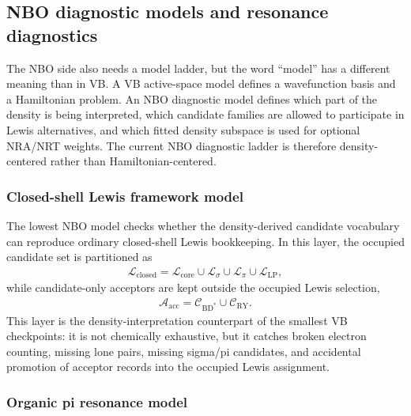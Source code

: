 \documentclass[11pt]{article}
\begin{document}
\subsection{NBO diagnostic models and resonance diagnostics}

The NBO side also needs a model ladder, but the word ``model'' has a different meaning than in VB.  A VB active-space model defines a wavefunction basis and a Hamiltonian problem.  An NBO diagnostic model defines which part of the density is being interpreted, which candidate families are allowed to participate in Lewis alternatives, and which fitted density subspace is used for optional NRA/NRT weights.  The current NBO diagnostic ladder is therefore density-centered rather than Hamiltonian-centered.

\subsubsection*{Closed-shell Lewis framework model}

The lowest NBO model checks whether the density-derived candidate vocabulary can reproduce ordinary closed-shell Lewis bookkeeping.  In this layer, the occupied candidate set is partitioned as
\begin{equation}
\begin{aligned}
	\mathcal{L}_{\mathrm{closed}}
	= \mathcal{L}_{\mathrm{core}}
	\cup \mathcal{L}_{\sigma}
	\cup \mathcal{L}_{\pi}
	\cup \mathcal{L}_{\mathrm{LP}},
\end{aligned}
\end{equation}
while candidate-only acceptors are kept outside the occupied Lewis selection,
\begin{equation}
\begin{aligned}
	\mathcal{A}_{\mathrm{acc}}
	= \mathcal{C}_{\mathrm{BD}^{\ast}}
	\cup \mathcal{C}_{\mathrm{RY}}.
\end{aligned}
\end{equation}
This layer is the density-interpretation counterpart of the smallest VB checkpoints: it is not chemically exhaustive, but it catches broken electron counting, missing lone pairs, missing sigma/pi candidates, and accidental promotion of acceptor records into the occupied Lewis assignment.

\subsubsection*{Organic pi resonance model}
\end{document}
